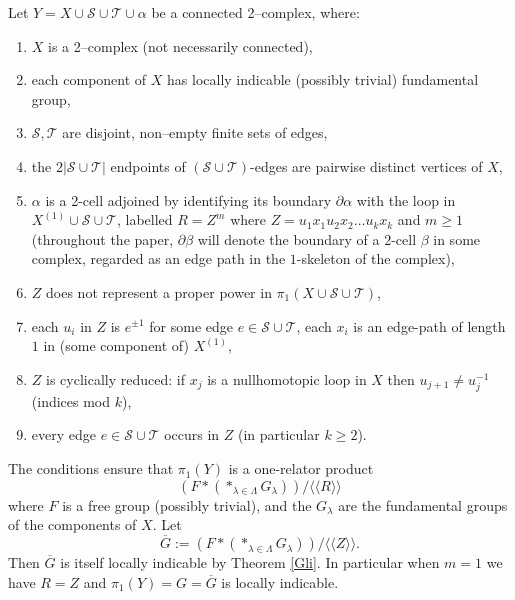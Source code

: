 \documentclass[12pt,a4paper]{amsart}
\def\ol{\overline}
\def\<{\langle}
\def\>{\rangle}
\def\a{\alpha}
\def\b{\beta}
\def\cS{\mathcal{S}}
\def\cT{\mathcal{T}}
\begin{document}
Let $Y=X\cup\cS\cup\cT\cup\alpha$ be a connected 2--complex, where:
\begin{enumerate}
	\item[$\bullet$]$X$ is a 2--complex 
	(not necessarily connected),  
	\item[$\bullet$] each component of $X$  has locally indicable (possibly trivial)
	fundamental group, 
	\item[$\bullet$] $\cS,\cT$ are  disjoint, non--empty finite sets of edges,
\item[$\bullet$] the $2|\cS\cup\cT|$ endpoints of $(\cS\cup\cT)$-edges are pairwise distinct vertices of $X$,
	\item[$\bullet$] $\alpha$ is a 2-cell adjoined by identifying its boundary
$\partial\a$ with the loop in $X^{(1)}\cup\cS\cup\cT$, 
	labelled $R=Z^m$ where $Z=u_1x_1u_2x_2\dots u_kx_k$ and $m\ge 1$
(throughout the paper, $\partial\b$ will denote the boundary of a $2$-cell $\b$ in some complex, regarded as an edge path in the $1$-skeleton of the complex),
\item[$\bullet$] $Z$ does not represent a proper power in $\pi_1(X\cup\cS\cup\cT)$, 
	\item[$\bullet$]  each $u_i$ in $Z$ is $e^{\pm1}$ for some edge $e\in\cS\cup\cT$, 
	each $x_i$ is  an  edge-path of length $1$ in (some component of) $X^{(1)}$,
\item[$\bullet$] $Z$ is cyclically reduced: if $x_j$ is a  nullhomotopic loop 
 in $X$ 
then $u_{j+1}\ne u_j^{-1}$ (indices mod $k$), 
	\item[$\bullet$] every edge $e\in\cS\cup\cT$ occurs in $Z$  (in particular  $k\ge 2$).
\end{enumerate}   



\smallskip\noindent
The conditions ensure that $\pi_1(Y)$ is a one-relator product
$$(F * (*_{\lambda\in\Lambda} G_\lambda ))/\<\<R\>\>$$
where $F$ is a free group (possibly trivial), 
and the $G_\lambda$ are the fundamental groups of the components of $X$. 
Let $$\ol{G}:=(F * (*_{\lambda\in\Lambda} G_\lambda ))/\<\<Z\>\>.$$
Then  
$\ol{G}$ is itself locally indicable by Theorem \ref{Gli}. 
In particular when $m=1$ we have $R=Z$ and 
$\pi_1(Y)=G=\ol{G}$ is locally indicable.
\end{document}
